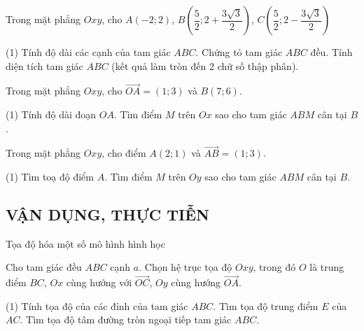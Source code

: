 \begin{vd}
	Trong mặt phẳng $Oxy$, cho $A(-2;2)$, $B\left(\dfrac{5}{2};2+\dfrac{3\sqrt{3}}{2} \right)$, $C\left(\dfrac{5}{2};2-\dfrac{3\sqrt{3}}{2} \right)$
	\begin{tasks}(1)
		\task Tính độ dài các cạnh của tam giác $ABC$. Chứng tỏ tam giác $ABC$ đều.
		\task Tính diện tích tam giác $ABC$ (kết quả làm tròn đến 2 chữ số thập phân).
	\end{tasks}
\end{vd}

\begin{vd}
	Trong mặt phẳng $Oxy$, cho $\vec{OA}=(1;3)$ và $B(7;6)$.
	\begin{tasks}(1)
		\task Tính độ dài đoạn $OA$.
		\task Tìm điểm $M$ trên $Ox$ sao cho tam giác $ABM$ cân tại $B$.
	\end{tasks}
\end{vd}

\begin{vd}
	Trong mặt phẳng $Oxy$, cho điểm $A(2;1)$ và $\vec{AB}=(1;3)$.
	\begin{tasks}(1)
		\task Tìm toạ độ điểm $A$.
		\task Tìm điểm $M$ trên $Oy$ sao cho tam giác $ABM$ cân tại $B$.
	\end{tasks}
\end{vd}

\subsection{VẬN DỤNG, THỰC TIỄN}
\begin{dang}{Tọa độ hóa một số mô hình hình học}
\end{dang}
\begin{vd}
	Cho tam giác đều $ABC$ cạnh $a$. Chọn hệ trục tọa độ $Oxy$, trong đó $O$ là trung điểm $BC$, $Ox$ cùng hướng với $\overrightarrow{OC}$, $Oy$ cùng hướng $\overrightarrow{OA}$.
	\begin{tasks}(1)
		\task Tính tọa độ của các đỉnh của tam giác $ABC$.
		\task Tìm tọa độ trung điểm $E$ của $AC$.
		\task Tìm tọa độ tâm đường tròn ngoại tiếp tam giác $ABC$.
	\end{tasks}
\end{vd}

